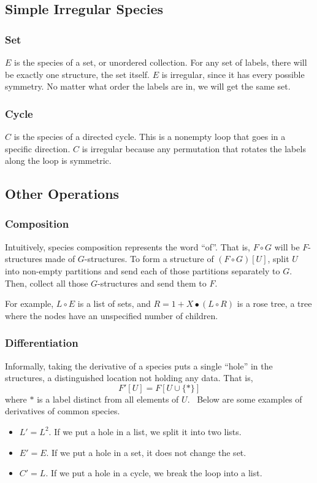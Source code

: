\documentclass{article}
\begin{document}
\subsection{Simple Irregular Species}
\subsubsection*{Set}
\( E \) is the species of a set, or unordered collection. For any set of labels, there will be
exactly one structure, the set itself. \( E \) is irregular, since it has every possible symmetry.
No matter what order the labels are in, we will get the same set.

\subsubsection*{Cycle}
\( C \) is the species of a directed cycle. This is a nonempty loop that goes in a specific
direction. \( C \) is irregular because any permutation that rotates the labels along the loop is
symmetric.

\subsection{Other Operations}
\subsubsection*{Composition}
Intuitively, species composition represents the word ``of''. That is, \( F \circ G \) will be \( F
\)-structures made of \( G \)-structures. To form a structure of \( (F \circ G)[U] \), split \( U \)
into non-empty partitions and send each of those partitions separately to \( G \).  Then, collect
all those \( G \)-structures and send them to \(F \).

For example, \( L \circ E \) is a list of sets, and \( R = 1 + X \bullet (L \circ R) \) is a rose
tree, a tree where the nodes have an unspecified number of children.

\subsubsection*{Differentiation}
Informally, taking the derivative of a species puts a single ``hole'' in the structures, a
distinguished location not holding any data. That is,
\[
  F'[U] = F[U \cup \{*\}]
\]
where \( * \) is a label distinct from all elements of \( U \).~\cite{yorgey} Below are some
examples of derivatives of common species.
\begin{itemize}
  \item
    \( L' = L^2 \).
    If we put a hole in a list, we split it into two lists.
  \item
    \( E' = E \).
    If we put a hole in a set, it does not change the set.
  \item
    \( C' = L \).
    If we put a hole in a cycle, we break the loop into a list.
\end{itemize}
\end{document}
